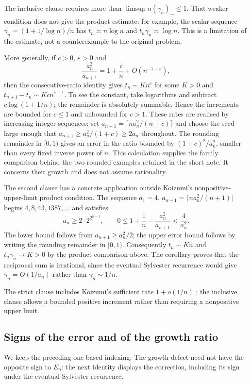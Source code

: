 \documentclass[11pt]{article}
\begin{document}
The inclusive clause requires more than $\limsup n(\gamma_n)_+\le1$.
That weaker condition does not give the product estimate: for example,
the scalar sequence $\gamma_n=(1+1/\log n)/n$ has $t_n\asymp n\log n$
and $t_n\gamma_n\asymp\log n$. This is a limitation of the estimate, not a
counterexample to the original problem.

More generally, if $c>0$, $\varepsilon>0$ and
\[
 \frac{a_n^2}{a_{n+1}}=1+\frac cn+O(n^{-1-\varepsilon}),
\]
then the consecutive-ratio identity gives $t_n\sim Kn^c$ for some
$K>0$ and $t_{n+1}-t_n\sim Kc n^{c-1}$. To see the constant, take
logarithms and subtract $c\log(1+1/n)$; the remainder is absolutely summable.
Hence the increments are bounded for $c\le1$ and unbounded for $c>1$.
These rates are realised by increasing integer sequences: set
$a_{n+1}=\lceil n a_n^2/(n+c)\rceil$ and choose the seed large enough
that $a_{n+1}\ge a_n^2/(1+c)\ge2a_n$ throughout. The rounding remainder
in $[0,1)$ gives an error in the ratio bounded by
$(1+c)^2/a_n^2$, smaller than every fixed inverse power of $n$.
This calculation supplies the family comparison behind the two rounded
examples retained in the short note. It concerns their growth and does
not assume rationality.

The second clause has a concrete application outside Koizumi's
nonpositive-upper-limit product condition. The sequence
$a_1=4$, $a_{n+1}=\lceil n a_n^2/(n+1)\rceil$ begins
$4,8,43,1387,\ldots$ and satisfies
\[
 a_n\ge2\cdot2^{2^{n-1}},\qquad
 0\le1+\frac1n-\frac{a_n^2}{a_{n+1}}<\frac4{a_n^2}.
\]
The lower bound follows from $a_{n+1}\ge a_n^2/2$; the upper error bound
follows by writing the rounding remainder in $[0,1)$.
Consequently $t_n\sim Kn$ and $t_n\gamma_n\to K>0$ by the product
comparison above. The corollary proves that the reciprocal sum is
irrational, since the eventual Sylvester recurrence would give
$\gamma_n=O(1/a_n)$ rather than $\gamma_n\sim1/n$.

The strict clause includes Koizumi's sufficient
rate $1+o(1/n)$ \cite[Remark~3, p.~16]{koizumi2025}; the inclusive clause
allows a bounded positive increment rather than requiring a nonpositive
upper limit.

\subsection{Signs of the error and of the growth ratio}

We keep the preceding one-based indexing. The growth defect need not
have the opposite sign to $E_n$: the next identity displays the
correction, including its sign under the eventual Sylvester recurrence.
\end{document}
